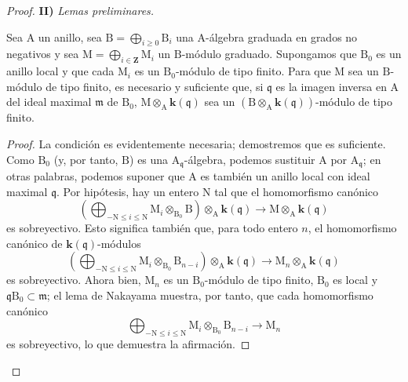 \begin{proof}
\medskip
\noindent\textbf{II)} \emph{Lemas preliminares.}

\begin{lemma}[11.2.9.3]
\label{IV.11.2.9.3}
Sea $\mathrm{A}$ un anillo, sea
$\mathrm{B}=\bigoplus_{i\geqslant 0}\mathrm{B}_i$ una
$\mathrm{A}$-álgebra graduada en grados no negativos y sea
$\mathrm{M}=\bigoplus_{i\in\mathbf{Z}}\mathrm{M}_i$ un
$\mathrm{B}$-módulo graduado. Supongamos que $\mathrm{B}_0$ es un anillo local y
que cada $\mathrm{M}_i$ es un $\mathrm{B}_0$-módulo de tipo finito.
Para que $\mathrm{M}$ sea un $\mathrm{B}$-módulo de tipo finito, es necesario
y suficiente que, si $\mathfrak{q}$ es la imagen inversa en
$\mathrm{A}$ del ideal maximal $\mathfrak{m}$ de $\mathrm{B}_0$,
$\mathrm{M}\otimes_\mathrm{A}\boldsymbol{k}(\mathfrak{q})$ sea un
$(\mathrm{B}\otimes_\mathrm{A}\boldsymbol{k}(\mathfrak{q}))$-módulo
de tipo finito.
\end{lemma}


\begin{proof}
La condición es evidentemente necesaria; demostremos que es
suficiente. Como $\mathrm{B}_0$ (y, por tanto, $\mathrm{B}$) es una
$\mathrm{A}_{\mathfrak{q}}$-álgebra, podemos sustituir $\mathrm{A}$ por
$\mathrm{A}_{\mathfrak{q}}$; en otras palabras, podemos suponer que
$\mathrm{A}$ es también un anillo local con ideal maximal
$\mathfrak{q}$. Por hipótesis, hay un entero $\mathrm{N}$ tal
que el homomorfismo canónico
\[
 \left(\bigoplus_{-\mathrm{N}\leqslant i\leqslant\mathrm{N}}
   \mathrm{M}_i\otimes_{\mathrm{B}_0}\mathrm{B}\right)
   \otimes_\mathrm{A}\boldsymbol{k}(\mathfrak{q})
 \longrightarrow
 \mathrm{M}\otimes_\mathrm{A}\boldsymbol{k}(\mathfrak{q})
\]
es sobreyectivo. Esto significa también que, para todo entero $n$, el
homomorfismo canónico de $\boldsymbol{k}(\mathfrak{q})$-módulos
\[
 \left(\bigoplus_{-\mathrm{N}\leqslant i\leqslant\mathrm{N}}
   \mathrm{M}_i\otimes_{\mathrm{B}_0}\mathrm{B}_{n-i}\right)
   \otimes_\mathrm{A}\boldsymbol{k}(\mathfrak{q})
 \longrightarrow
 \mathrm{M}_n\otimes_\mathrm{A}\boldsymbol{k}(\mathfrak{q})
\]
es sobreyectivo. Ahora bien, $\mathrm{M}_n$ es un
$\mathrm{B}_0$-módulo de tipo finito, $\mathrm{B}_0$ es local y
$\mathfrak{q}\mathrm{B}_0\subset\mathfrak{m}$; el lema de Nakayama
muestra, por tanto, que cada homomorfismo canónico
\[
 \bigoplus_{-\mathrm{N}\leqslant i\leqslant\mathrm{N}}
   \mathrm{M}_i\otimes_{\mathrm{B}_0}\mathrm{B}_{n-i}
 \longrightarrow \mathrm{M}_n
\]
es sobreyectivo, lo que demuestra la afirmación.
\end{proof}


\end{proof}
